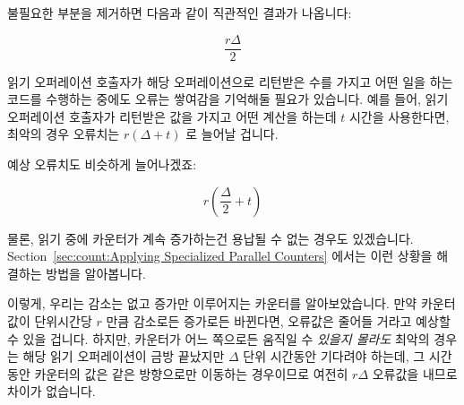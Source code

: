 {	불필요한 부분을 제거하면 다음과 같이 직관적인 결과가 나옵니다:

	\begin{equation}
		\frac{r \Delta}{2}
	\label{eq:count:CounterErrorAverage}
	\end{equation}

	읽기 오퍼레이션 호출자가 해당 오퍼레이션으로 리턴받은 수를 가지고 어떤
	일을 하는 코드를 수행하는 중에도 오류는 쌓여감을 기억해둘 필요가
	있습니다.
	예를 들어, 읽기 오퍼레이션 호출자가 리턴받은 값을 가지고 어떤 계산을
	하는데 $t$ 시간을 사용한다면, 최악의 경우 오류치는 $r \left(\Delta +
	t\right)$ 로 늘어날 겁니다.

	예상 오류치도 비슷하게 늘어나겠죠:

	\begin{equation}
		r \left( \frac{\Delta}{2} + t \right)
	\end{equation}

	물론, 읽기 중에 카운터가 계속 증가하는건 용납될 수 없는 경우도
	있겠습니다.
	Section~\ref{sec:count:Applying Specialized Parallel Counters}
	에서는 이런 상황을 해결하는 방법을 알아봅니다.

	이렇게, 우리는 감소는 없고 증가만 이루어지는 카운터를 알아보았습니다.
	만약 카운터 값이 단위시간당 $r$ 만큼 감소로든 증가로든 바뀐다면,
	오류값은 줄어들 거라고 예상할 수 있을 겁니다.
	하지만, 카운터가 어느 쪽으로든 움직일 수 \emph{있을지 몰라도} 최악의
	경우는 해당 읽기 오퍼레이션이 금방 끝났지만 $\Delta$ 단위 시간동안
	기다려야 하는데, 그 시간 동안 카운터의 값은 같은 방향으로만 이동하는
	경우이므로 여전히 $r \Delta$ 오류값을 내므로 차이가 없습니다.
	\iffalse

}
